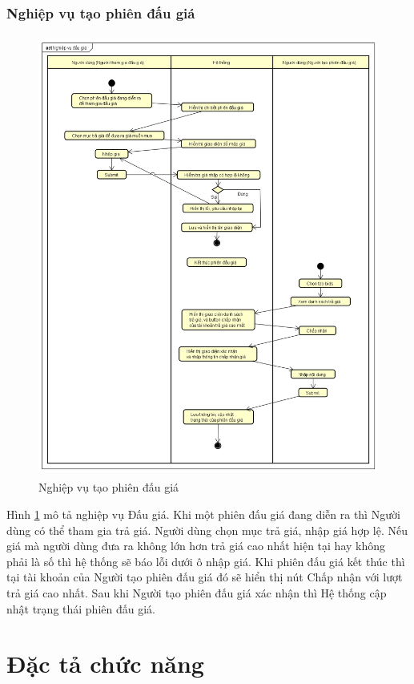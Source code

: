 \documentclass[../DoAn.tex]{subfiles}
\begin{document}
\subsubsection{Nghiệp vụ tạo phiên đấu giá}
\label{subsubsection:2.2.7.2}
\begin{figure}[H]
    \centering
    \includegraphics[width=11.4cm,height=14.54cm]{Hinhve/nghiệp vụ đấu giá.png}
    \caption{Nghiệp vụ tạo phiên đấu giá}
    \label{fig:Fig28}
\end{figure}
Hình \ref{fig:Fig28} mô tả nghiệp vụ Đấu giá. Khi một phiên đấu giá đang diễn ra thì Người dùng có thể tham gia trả giá. Người dùng chọn mục trả giá, nhập giá hợp lệ. Nếu giá mà người dùng đưa ra không lớn hơn trả giá cao nhất hiện tại hay không phải là số thì hệ thống sẽ báo lỗi dưới ô nhập giá. Khi phiên đấu giá kết thúc thì tại tài khoản của Người tạo phiên đấu giá đó sẽ hiển thị nút Chấp nhận với lượt trả giá cao nhất. Sau khi Người tạo phiên đấu giá xác nhận thì Hệ thống cập nhật trạng thái phiên đấu giá.
\section{Đặc tả chức năng}
\label{section:2.3}
\end{document}
